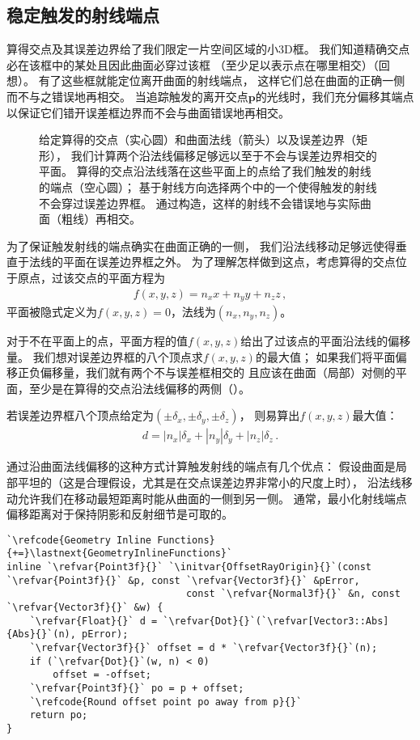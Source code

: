 \subsection{稳定触发的射线端点}\label{sub:稳定触发的射线端点}
算得交点及其误差边界给了我们限定一片空间区域的小3D框。
我们知道精确交点必在该框中的某处且因此曲面必穿过该框
（至少足以表示点在哪里相交）（回想）。
有了这些框就能定位离开曲面的射线端点，
这样它们总在曲面的正确一侧而不与之错误地再相交。
当追踪触发的离开交点$\bm p$的光线时，我们充分偏移其端点
以保证它们错开误差框边界而不会与曲面错误地再相交。
\begin{figure}[htbp]
    \centering
    \caption{给定算得的交点（实心圆）和曲面法线（箭头）以及误差边界（矩形），
        我们计算两个沿法线偏移足够远以至于不会与误差边界相交的平面。
        算得的交点沿法线落在这些平面上的点给了我们触发的射线的端点（空心圆）；
        基于射线方向选择两个中的一个使得触发的射线不会穿过误差边界框。
        通过构造，这样的射线不会错误地与实际曲面（粗线）再相交。}
    \label{fig:3.45}
\end{figure}

为了保证触发射线的端点确实在曲面正确的一侧，
我们沿法线移动足够远使得垂直于法线的平面在误差边界框之外。
为了理解怎样做到这点，考虑算得的交点位于原点，过该交点的平面方程为
\begin{align*}
    f(x,y,z)=n_xx+n_yy+n_zz\, ,
\end{align*}
平面被隐式定义为$f(x,y,z)=0$，法线为$(n_x,n_y,n_z)$。

对于不在平面上的点，平面方程的值$f(x,y,z)$给出了过该点的平面沿法线的偏移量。
我们想对误差边界框的八个顶点求$f(x,y,z)$的最大值；
如果我们将平面偏移正负偏移量，我们就有两个不与误差框相交的
且应该在曲面（局部）对侧的平面，至少是在算得的交点沿法线偏移的两侧（）。

若误差边界框八个顶点给定为$(\pm\delta_x,\pm\delta_y,\pm\delta_z)$，
则易算出$f(x,y,z)$最大值：
\begin{align*}
    d=|n_x|\delta_x+|n_y|\delta_y+|n_z|\delta_z\, .
\end{align*}

通过沿曲面法线偏移的这种方式计算触发射线的端点有几个优点：
假设曲面是局部平坦的（这是合理假设，尤其是在交点误差边界非常小的尺度上时），
沿法线移动允许我们在移动最短距离时能从曲面的一侧到另一侧。
通常，最小化射线端点偏移距离对于保持阴影和反射细节是可取的。
\begin{lstlisting}
`\refcode{Geometry Inline Functions}{+=}\lastnext{GeometryInlineFunctions}`
inline `\refvar{Point3f}{}` `\initvar{OffsetRayOrigin}{}`(const `\refvar{Point3f}{}` &p, const `\refvar{Vector3f}{}` &pError,
                               const `\refvar{Normal3f}{}` &n, const `\refvar{Vector3f}{}` &w) {
    `\refvar{Float}{}` d = `\refvar{Dot}{}`(`\refvar[Vector3::Abs]{Abs}{}`(n), pError);
    `\refvar{Vector3f}{}` offset = d * `\refvar{Vector3f}{}`(n);
    if (`\refvar{Dot}{}`(w, n) < 0)
        offset = -offset;
    `\refvar{Point3f}{}` po = p + offset;
    `\refcode{Round offset point po away from p}{}`
    return po;
}
\end{lstlisting}

